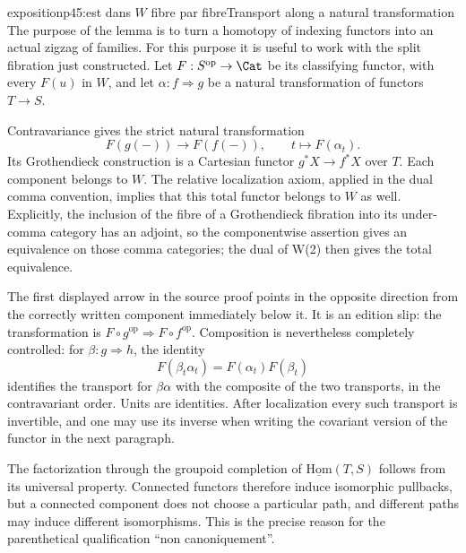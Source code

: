 \begin{dcomment}{exposition}{p45:est dans $W$ fibre par fibre}{Transport along a natural transformation}
The purpose of the lemma is to turn a homotopy of indexing functors into an actual zigzag of families. For this purpose it is useful to work with the split fibration just constructed. Let $F:S^{\mathrm{op}}\to\Cat$ be its classifying functor, with every $F(u)$ in $W$, and let $\alpha:f\Rightarrow g$ be a natural transformation of functors $T\to S$.

Contravariance gives the strict natural transformation
\[
 F(g(-))\longrightarrow F(f(-)),\qquad
 t\longmapsto F(\alpha_t).
\]
Its Grothendieck construction is a Cartesian functor $g^*X\to f^*X$ over $T$. Each component belongs to $W$. The relative localization axiom, applied in the dual comma convention, implies that this total functor belongs to $W$ as well. Explicitly, the inclusion of the fibre of a Grothendieck fibration into its under-comma category has an adjoint, so the componentwise assertion gives an equivalence on those comma categories; the dual of W(2) then gives the total equivalence.

The first displayed arrow in the source proof points in the opposite direction from the correctly written component immediately below it. It is an edition slip: the transformation is $F\circ g^{\mathrm{op}}\Rightarrow F\circ f^{\mathrm{op}}$. Composition is nevertheless completely controlled: for $\beta:g\Rightarrow h$, the identity
\[
 F(\beta_t\alpha_t)=F(\alpha_t)F(\beta_t)
\]
identifies the transport for $\beta\alpha$ with the composite of the two transports, in the contravariant order. Units are identities. After localization every such transport is invertible, and one may use its inverse when writing the covariant version of the functor in the next paragraph.

The factorization through the groupoid completion of $\underline{\mathrm{Hom}}(T,S)$ follows from its universal property. Connected functors therefore induce isomorphic pullbacks, but a connected component does not choose a particular path, and different paths may induce different isomorphisms. This is the precise reason for the parenthetical qualification ``non canoniquement''.
\end{dcomment}

